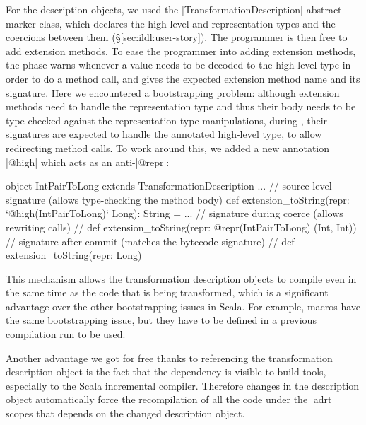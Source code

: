For the description objects, we used the |TransformationDescription| abstract marker class, which declares the high-level and representation types and the coercions between them (\S\ref{sec:ildl:user-story}). The programmer is then free to add extension methods. To ease the programmer into adding extension methods, the \coerce{} phase warns whenever a value needs to be decoded to the high-level type in order to do a method call, and gives the expected extension method name and its signature. Here we encountered a bootstrapping problem: although extension methods need to handle the representation type and thus their body needs to be type-checked against the representation type manipulations, during \coerce{}, their signatures are expected to handle the annotated high-level type, to allow redirecting method calls. To work around this, we added a new annotation |@high| which acts as an anti-|@repr|:

\begin{lstlisting-nobreak}
object IntPairToLong extends TransformationDescription {
  ...
  // source-level signature (allows type-checking the method body)
  def extension_toString(repr: `@high(IntPairToLong)` Long): String = ...
  // signature during coerce (allows rewriting calls)
  //   def extension_toString(repr: @repr(IntPairToLong) (Int, Int))
  // signature after commit (matches the bytecode signature)
  //   def extension_toString(repr: Long)
}
\end{lstlisting-nobreak}

This mechanism allows the transformation description objects to compile even in the same time as the code that is being transformed, which is a significant advantage over the other bootstrapping issues in Scala. For example, macros have the same bootstrapping issue, but they have to be defined in a previous compilation run to be used.

Another advantage we got for free thanks to referencing the transformation description object is the fact that the dependency is visible to build tools, especially to the Scala incremental compiler. Therefore changes in the description object automatically force the recompilation of all the code under the |adrt| scopes that depends on the changed description object.

